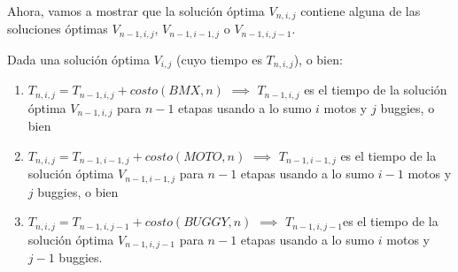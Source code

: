     Ahora, vamos a mostrar que la solución óptima $V_{n,i,j}$ contiene alguna de las soluciones óptimas $V_{n-1,i,j}$, $V_{n-1,i-1,j}$ o $V_{n-1,i,j-1}$.

    \begin{lemma}
        Dada una solución óptima $V_{i,j}$ (cuyo tiempo es $T_{n,i,j}$), o bien:
        \begin{enumerate}
            \item $T_{n,i,j} = T_{n-1,i,j} + costo(BMX, n)$ $\implies$ $T_{n-1,i,j}$ es el tiempo de la solución óptima $V_{n-1,i,j}$ para $n-1$ etapas usando a lo sumo $i$ motos y $j$ buggies, o bien
            \item $T_{n,i,j} = T_{n-1,i-1,j} + costo(MOTO, n)$ $\implies$ $T_{n-1,i-1,j}$ es el tiempo de la solución óptima $V_{n-1,i-1,j}$ para $n-1$ etapas usando a lo sumo $i-1$ motos y $j$ buggies, o bien
            \item $T_{n,i,j} = T_{n-1,i,j-1} + costo(BUGGY, n)$ $\implies$ $T_{n-1,i,j-1}$es el tiempo de la solución óptima $V_{n-1,i,j-1}$ para $n-1$ etapas usando a lo sumo $i$ motos y $j-1$ buggies.
        \end{enumerate}
    \end{lemma}
